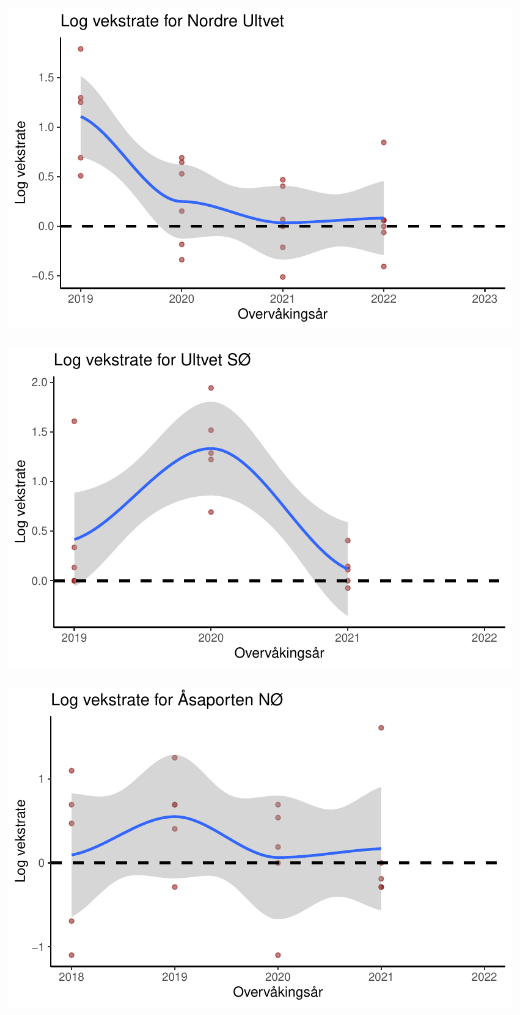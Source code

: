 \documentclass[
  letterpaper,
  DIV=11,
  numbers=noendperiod]{scrreport}
\begin{document}
\includegraphics{growthRate_files/figure-pdf/unnamed-chunk-5-5.pdf}

\includegraphics{growthRate_files/figure-pdf/unnamed-chunk-5-6.pdf}

\includegraphics{growthRate_files/figure-pdf/unnamed-chunk-5-7.pdf}
\end{document}
